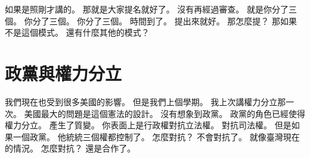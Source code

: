 \hypertarget{w01:cue:1849}{}如果是照剛才講的。
\hypertarget{w01:cue:1850}{}那就是大家提名就好了。
\hypertarget{w01:cue:1851}{}沒有再經過審查。
\hypertarget{w01:cue:1852}{}就是你分了三個。
\hypertarget{w01:cue:1853}{}你分了三個。
\hypertarget{w01:cue:1854}{}你分了三個。
\hypertarget{w01:cue:1855}{}時間到了。
\hypertarget{w01:cue:1856}{}提出來就好。
\hypertarget{w01:cue:1857}{}那怎麼提？
\hypertarget{w01:cue:1858}{}那如果不是這個模式。
\hypertarget{w01:cue:1859}{}還有什麼其他的模式？

\section{政黨與權力分立}

\hypertarget{w01:cue:1860}{}我們現在也受到很多美國的影響。
\hypertarget{w01:cue:1861}{}但是我們上個學期。
\hypertarget{w01:cue:1862}{}我上次講權力分立那一次。
\hypertarget{w01:cue:1863}{}美國最大的問題是這個憲法的設計。
\hypertarget{w01:cue:1864}{}沒有想象到政黨。
\hypertarget{w01:cue:1865}{}政黨的角色已經使得權力分立。
\hypertarget{w01:cue:1866}{}產生了質變。
\hypertarget{w01:cue:1867}{}你表面上是行政權對抗立法權。
\hypertarget{w01:cue:1868}{}對抗司法權。
\hypertarget{w01:cue:1869}{}但是如果一個政黨。
\hypertarget{w01:cue:1870}{}他統統三個權都控制了。
\hypertarget{w01:cue:1871}{}怎麼對抗？
\hypertarget{w01:cue:1872}{}不會對抗了。
\hypertarget{w01:cue:1873}{}就像臺灣現在的情況。
\hypertarget{w01:cue:1874}{}怎麼對抗？
\hypertarget{w01:cue:1875}{}還是合作了。

